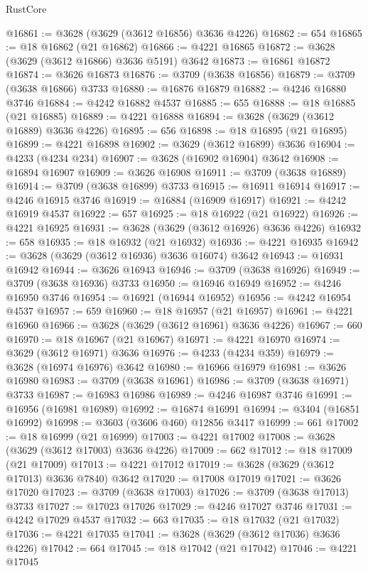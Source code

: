\begin{lexlean}{RustCore}
\begin{coremodule}
@16861 := @3628 (@3629 (@3612 @16856) @3636 @4226)
@16862 := 654
@16865 := @18 @16862 (@21 @16862)
@16866 := @4221 @16865
@16872 := @3628 (@3629 (@3612 @16866) @3636 @5191) @3642
@16873 := @16861 @16872
@16874 := @3626 @16873
@16876 := @3709 (@3638 @16856)
@16879 := @3709 (@3638 @16866) @3733
@16880 := @16876 @16879
@16882 := @4246 @16880 @3746
@16884 := @4242 @16882 @4537
@16885 := 655
@16888 := @18 @16885 (@21 @16885)
@16889 := @4221 @16888
@16894 := @3628 (@3629 (@3612 @16889) @3636 @4226)
@16895 := 656
@16898 := @18 @16895 (@21 @16895)
@16899 := @4221 @16898
@16902 := @3629 (@3612 @16899) @3636
@16904 := @4233 (@4234 @234)
@16907 := @3628 (@16902 @16904) @3642
@16908 := @16894 @16907
@16909 := @3626 @16908
@16911 := @3709 (@3638 @16889)
@16914 := @3709 (@3638 @16899) @3733
@16915 := @16911 @16914
@16917 := @4246 @16915 @3746
@16919 := @16884 (@16909 @16917)
@16921 := @4242 @16919 @4537
@16922 := 657
@16925 := @18 @16922 (@21 @16922)
@16926 := @4221 @16925
@16931 := @3628 (@3629 (@3612 @16926) @3636 @4226)
@16932 := 658
@16935 := @18 @16932 (@21 @16932)
@16936 := @4221 @16935
@16942 := @3628 (@3629 (@3612 @16936) @3636 @16074) @3642
@16943 := @16931 @16942
@16944 := @3626 @16943
@16946 := @3709 (@3638 @16926)
@16949 := @3709 (@3638 @16936) @3733
@16950 := @16946 @16949
@16952 := @4246 @16950 @3746
@16954 := @16921 (@16944 @16952)
@16956 := @4242 @16954 @4537
@16957 := 659
@16960 := @18 @16957 (@21 @16957)
@16961 := @4221 @16960
@16966 := @3628 (@3629 (@3612 @16961) @3636 @4226)
@16967 := 660
@16970 := @18 @16967 (@21 @16967)
@16971 := @4221 @16970
@16974 := @3629 (@3612 @16971) @3636
@16976 := @4233 (@4234 @359)
@16979 := @3628 (@16974 @16976) @3642
@16980 := @16966 @16979
@16981 := @3626 @16980
@16983 := @3709 (@3638 @16961)
@16986 := @3709 (@3638 @16971) @3733
@16987 := @16983 @16986
@16989 := @4246 @16987 @3746
@16991 := @16956 (@16981 @16989)
@16992 := @16874 @16991
@16994 := @3404 (@16851 @16992)
@16998 := @3603 (@3606 @460) @12856 @3417
@16999 := 661
@17002 := @18 @16999 (@21 @16999)
@17003 := @4221 @17002
@17008 := @3628 (@3629 (@3612 @17003) @3636 @4226)
@17009 := 662
@17012 := @18 @17009 (@21 @17009)
@17013 := @4221 @17012
@17019 := @3628 (@3629 (@3612 @17013) @3636 @7840) @3642
@17020 := @17008 @17019
@17021 := @3626 @17020
@17023 := @3709 (@3638 @17003)
@17026 := @3709 (@3638 @17013) @3733
@17027 := @17023 @17026
@17029 := @4246 @17027 @3746
@17031 := @4242 @17029 @4537
@17032 := 663
@17035 := @18 @17032 (@21 @17032)
@17036 := @4221 @17035
@17041 := @3628 (@3629 (@3612 @17036) @3636 @4226)
@17042 := 664
@17045 := @18 @17042 (@21 @17042)
@17046 := @4221 @17045

\end{coremodule}
\end{lexlean}
